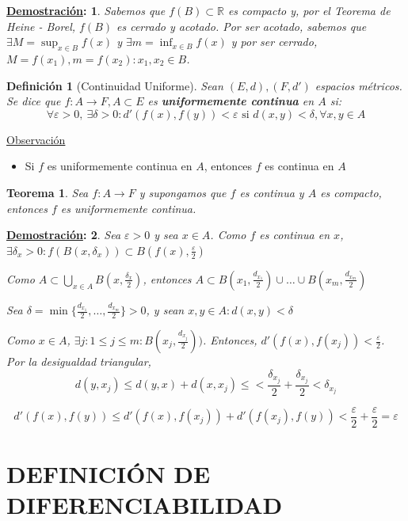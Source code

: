 \documentclass[10pt,a4paper,openright]{book}
\theoremstyle{break}
\newtheorem*{defi}{Definición}
\newtheorem*{theo}{Teorema}
\newtheorem*{demo}{\underline{Demostración}:}
\begin{document}
\begin{demo}
Sabemos que $f(B) \subset \mathbb{R}$ es compacto y, por el Teorema de Heine - Borel, $f(B)$ es cerrado y acotado. Por ser acotado, sabemos que $\exists M = \sup_{x \in B} f(x)$ y $\exists m = \inf_{x \in B} f(x)$ y por ser cerrado, $M = f(x_1), m = f(x_2) : x_1, x_2 \in B$.
\end{demo}

\begin{defi}[Continuidad Uniforme]
Sean $(E,d), (F, d')$ espacios métricos. Se dice que $f: A \to F, A \subset E$ es \textbf{uniformemente continua} en $A$ si:
$$\forall \varepsilon > 0, \ \exists \delta > 0 : d'(f(x), f(y)) < \varepsilon \mbox{ si } d(x,y) < \delta, \forall x,y \in A$$
\end{defi}

\underline{Observación}
\begin{itemize}
\item Si $f$ es uniformemente continua en $A$, entonces $f$ es continua en $A$
\end{itemize}

\begin{theo}
Sea $f: A \to F$ y supongamos que $f$ es continua y $A$ es compacto, entonces $f$ es uniformemente continua.
\end{theo}
\begin{demo}
Sea $\varepsilon > 0$ y sea $x \in A$. Como $f$ es continua en $x$, $\exists \delta_x > 0 : f(B(x, \delta_x)) \subset B(f(x), \frac{\varepsilon}{2})$

Como $A \subset \bigcup_{x \in A} B(x, \frac{\delta_x}{2})$, entonces $A \subset B(x_1, \frac{d_{x_1}}{2}) \cup \ldots \cup B(x_m,  \frac{d_{x_m}}{2})$

Sea $\delta = \min\{ \frac{d_{x_1}}{2}, \ldots,  \frac{d_{x_m}}{2}\} > 0$, y sean $x,y \in A : d(x,y) < \delta$

Como $x\in A$, $\exists j : 1 \leq j \leq m : B(x_j,  \frac{d_{x_j}}{2}))$. Entonces, $d'(f(x), f(x_j)) < \frac{\varepsilon}{2}$. Por la desigualdad triangular, $$d(y,x_j) \leq d(y,x) + d(x,x_j) \leq < \frac{\delta _{x_j}}{2} + \frac{\delta _{x_j}}{2} < \delta _{x_j}$$

$$d'(f(x), f(y)) \leq d'(f(x), f(x_j)) + d'(f(x_j), f(y)) < \frac{\varepsilon}{2} + \frac{\varepsilon}{2} = \varepsilon$$
\end{demo}

\section*{DEFINICIÓN DE DIFERENCIABILIDAD}
\end{document}
